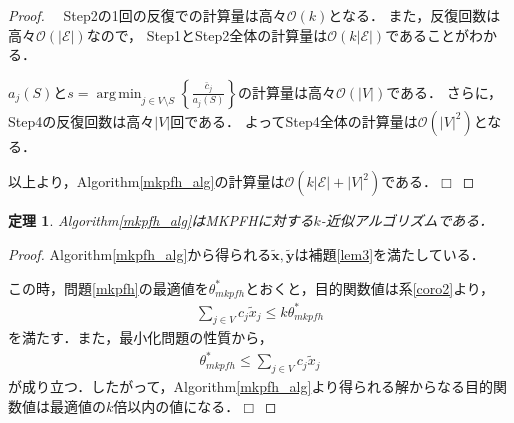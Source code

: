 \documentclass[11pt,dvipdfmx]{jarticle}
\def\qed{\hfill $\Box$}
\DeclareMathOperator*{\argmin}{arg\,min}
\numberwithin{equation}{section}
\newtheorem{theorem}{定理}[section]
\newtheorem{proof}{証明}
\begin{document}
        \begin{proof}
            \rm　Step2の1回の反復での計算量は高々$\mathcal{O}(k)$となる．
            また，反復回数は高々$\mathcal{O}(|\mathcal{E}|)$なので，
            Step1とStep2全体の計算量は$\mathcal{O}(k|\mathcal{E}|)$であることがわかる．\par
            $a_j(S)$と$s=\argmin_{j\in V\setminus S}\left\{\frac{\bar{c}_j}{a_j(S)}\right\}$の計算量は高々$\mathcal{O}(|V|)$である．
            さらに，Step4の反復回数は高々$|V|$回である．
            よってStep4全体の計算量は$\mathcal{O}(|V|^2)$となる．\par
            以上より，Algorithm\ref{mkpfh_alg}の計算量は$\mathcal{O}(k|\mathcal{E}|+|V|^2)$である．\qed
        \end{proof}
        \begin{theorem}
            \rm Algorithm\ref{mkpfh_alg}はMKPFHに対する$k$-近似アルゴリズムである．
        \end{theorem}
        \begin{proof}
            \rm Algorithm\ref{mkpfh_alg}から得られる$\tilde{\bm{x}},\tilde{\bm{y}}$は補題\ref{lem3}を満たしている．\par
            この時，問題\eqref{mkpfh}の最適値を$\theta^*_{mkpfh}$とおくと，目的関数値は系\ref{coro2}より，
            \begin{align}
                \sum_{j\in V}{c_j\tilde{x}_j}\le k\theta^*_{mkpfh}
            \end{align}
            を満たす．また，最小化問題の性質から，
            \begin{align}
                \theta^*_{mkpfh}\le\sum_{j\in V}{c_j\tilde{x}_j}
            \end{align}
            が成り立つ．したがって，Algorithm\ref{mkpfh_alg}より得られる解からなる目的関数値は最適値の$k$倍以内の値になる．\qed
        \end{proof}
\makeatletter
\renewcommand{\thealgorithm}{\Alph{algorithm}}
\makeatother
\end{document}
